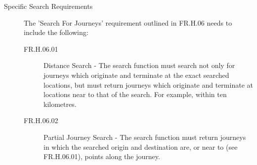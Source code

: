 \documentclass[11pt]{article}
\begin{document}
\begin{description}
\item[Specific Search Requirements] The 'Search For Journeys' requirement outlined in FR.H.06 needs to include the following:

\begin{description}

\item[FR.H.06.01] Distance Search - The search function must search not only for journeys which originate and terminate at the exact searched locations, but must return journeys which originate and terminate at locations near to that of the search. For example, within ten kilometres.
\item[FR.H.06.02] Partial Journey Search - The search function must return journeys in which the searched origin and destination are, or near to (see FR.H.06.01), points along the journey.
\end{description}
\end{description}
\end{document}
